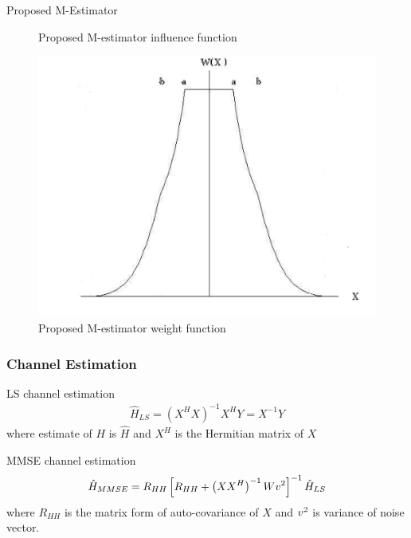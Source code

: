 \documentclass{beamer}
\begin{document}
\begin{frame}{Proposed M-Estimator}
\begin{multicols}{3}
\begin{figure}
\caption{ Proposed M-estimator influence function}
\label{fig:psi}
\end{figure}
\begin{figure}
\includegraphics[scale=0.15]{images/weight.png}
\caption{Proposed M-estimator weight function}
\label{fig:w}
\end{figure}
\end{multicols}
\end{frame}


\begin{frame}
\frametitle{Channel Estimation}
\begin{block}{LS channel estimation}
\begin{align}
    \hat{H}_{LS} = \left( X^{H} X \right)^{-1} X^{H}Y =X^{-1}Y
\end{align}
where estimate of $H$ is $\hat{H}$ and $X^{H}$ is the Hermitian matrix of $X$ 
\end{block}
\begin{block}{MMSE channel estimation}
\begin{align}
    \hat{H}_{MMSE}= R_{HH} \left[ R_{HH} + \left( X X^{H}\right)^{-1} W \mathnormal{v}^{2} \right]^{-1} \hat{H}_{LS}
\end{align}
where $R_{HH}$ is the matrix form of auto-covariance of $X$ and
   $\mathnormal{v}^{2}$ is variance of noise vector.
\end{block}
\end{frame}

\end{document}
